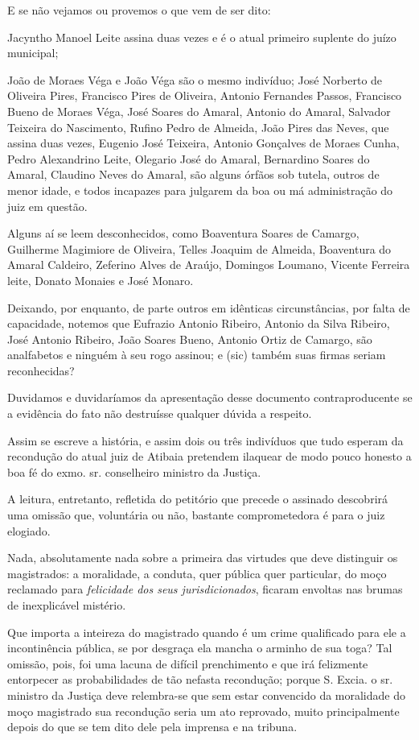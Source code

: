 E se não vejamos ou provemos o que vem de ser dito:

Jacyntho Manoel Leite assina duas vezes e é o atual primeiro suplente do
juízo municipal;

João de Moraes Véga e João Véga são o mesmo indivíduo; José Norberto de
Oliveira Pires, Francisco Pires de Oliveira, Antonio Fernandes Passos,
Francisco Bueno de Moraes Véga, José Soares do Amaral, Antonio do
Amaral, Salvador Teixeira do Nascimento, Rufino Pedro de Almeida, João
Pires das Neves, que assina duas vezes, Eugenio José Teixeira, Antonio
Gonçalves de Moraes Cunha, Pedro Alexandrino Leite, Olegario José do
Amaral, Bernardino Soares do Amaral, Claudino Neves do Amaral, são
alguns órfãos sob tutela, outros de menor idade, e todos incapazes para
julgarem da boa ou má administração do juiz em questão.

Alguns aí se leem desconhecidos, como Boaventura Soares de Camargo,
Guilherme Magimiore de Oliveira, Telles Joaquim de Almeida, Boaventura
do Amaral Caldeiro, Zeferino Alves de Araújo, Domingos Loumano, Vicente
Ferreira leite, Donato Monaies e José Monaro.

Deixando, por enquanto, de parte outros em idênticas circunstâncias, por
falta de capacidade, notemos que Eufrazio Antonio Ribeiro, Antonio da
Silva Ribeiro, José Antonio Ribeiro, João Soares Bueno, Antonio Ortiz de
Camargo, são analfabetos e ninguém à seu rogo assinou; e (sic) também
suas firmas seriam reconhecidas?

Duvidamos e duvidaríamos da apresentação desse documento
contraproducente se a evidência do fato não destruísse qualquer dúvida a
respeito.

Assim se escreve a história, e assim dois ou três indivíduos que tudo
esperam da recondução do atual juiz de Atibaia pretendem ilaquear de
modo pouco honesto a boa fé do exmo. sr. conselheiro ministro da
Justiça.

A leitura, entretanto, refletida do petitório que precede o assinado
descobrirá uma omissão que, voluntária ou não, bastante comprometedora é
para o juiz elogiado.

Nada, absolutamente nada sobre a primeira das virtudes que deve
distinguir os magistrados: a moralidade, a conduta, quer pública quer
particular, do moço reclamado para \emph{felicidade dos seus
jurisdicionados}, ficaram envoltas nas brumas de inexplicável mistério.

Que importa a inteireza do magistrado quando é um crime qualificado para
ele a incontinência pública, se por desgraça ela mancha o arminho de sua
toga? Tal omissão, pois, foi uma lacuna de difícil prenchimento e que
irá felizmente entorpecer as probabilidades de tão nefasta recondução;
porque S. Excia. o sr. ministro da Justiça deve relembra-se que sem
estar convencido da moralidade do moço magistrado sua recondução seria
um ato reprovado, muito principalmente depois do que se tem dito dele
pela imprensa e na tribuna.

